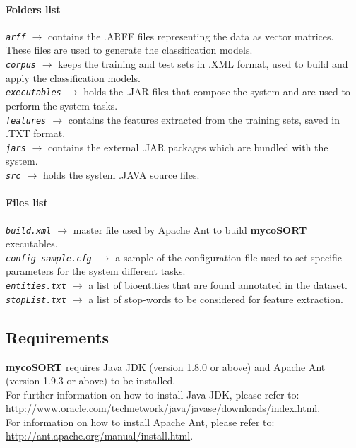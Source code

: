 \documentclass[11pt]{article}
\newcommand{\mycos}{{\bf{mycoSORT{ }}}}
\newcommand{\configsample}{\texttt{config-sample.cfg{ }}}
\begin{document}
\paragraph{Folders list} 
\textit{\texttt{arff} $\rightarrow$} contains the .ARFF files representing the data as vector matrices. These files are used to generate the classification models. \\
\textit{\texttt{corpus} $\rightarrow$} keeps the training and test sets in .XML format, used to build and apply the classification models. \\
\textit{\texttt{executables} $\rightarrow$} holds the .JAR files that compose the system and are used to perform the system tasks. \\
\textit{\texttt{features} $\rightarrow$} contains the features extracted from the training sets, saved in .TXT format. \\
\textit{\texttt{jars} $\rightarrow$} contains the external .JAR packages which are bundled with the system.\\
\textit{\texttt{src} $\rightarrow$} holds the system .JAVA source files. 

\paragraph{Files list} 
\textit{\texttt{build.xml} $\rightarrow$} master file used by Apache Ant to build \mycos{} executables. \\
\textit{\configsample $\rightarrow$} a sample of the configuration file used to set specific parameters for the system different tasks. \\
\textit{\texttt{entities.txt} $\rightarrow$} a list of bioentities that are found annotated in the dataset. \\
\textit{\texttt{stopList.txt} $\rightarrow$} a list of stop-words to be considered for feature extraction.

\subsection{Requirements}
\mycos{} requires Java JDK (version 1.8.0 or above)  and Apache Ant (version 1.9.3 or above) to be installed.\\
For further information on how to install Java JDK, please refer to: \\ \url{http://www.oracle.com/technetwork/java/javase/downloads/index.html}. \\
For information on how to install Apache Ant, please refer to: \\ \url{http://ant.apache.org/manual/install.html}.
\end{document}
